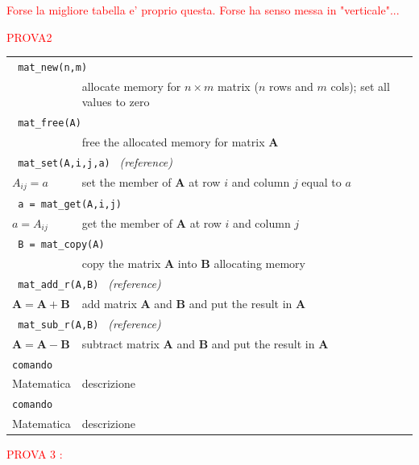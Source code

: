 \documentclass[10pt]{article}
\begin{document}
\textcolor{red}{Forse la migliore tabella e' proprio questa. Forse ha senso messa in "verticale"...}


\newpage

\textcolor{red}{PROVA2}

\begin{longtable}{@{} p{4cm} p{7cm} @{}}
\toprule
\multicolumn{2}{l}{\texttt{ mat\_new(n,m) }} \\
 &
allocate memory for $n\times m$ matrix ($n$ rows and $m$ cols); set all values to zero \\
\hline
\multicolumn{2}{l}{\texttt{ mat\_free(A)} } \\
 &
free the allocated memory for matrix $\mathbf{A}$ \\
\hline
\multicolumn{2}{l}{\texttt{ mat\_set(A,i,j,a) } \hfill \textit{(reference)}} \\
$A_{ij}=a$ &
set the member of $\mathbf{A}$ at row $i$ and column $j$ equal to $a$ \\
\hline
\multicolumn{2}{l}{\texttt{ a = mat\_get(A,i,j) }} \\
$a=A_{ij}$ &
get the member of $\mathbf{A}$ at row $i$ and column $j$ \\
\hline
\multicolumn{2}{l}{\texttt{ B = mat\_copy(A) }} \\
 &
copy the matrix $\mathbf{A}$ into $\mathbf{B}$ allocating memory \\
\hline
\multicolumn{2}{l}{\texttt{ mat\_add\_r(A,B) } \hfill \textit{(reference)}} \\
$\mathbf{A}=\mathbf{A}+\mathbf{B}$ &
add matrix $\mathbf{A}$ and $\mathbf{B}$ and put the result in $\mathbf{A}$ \\
\hline
\multicolumn{2}{l}{\texttt{ mat\_sub\_r(A,B) } \hfill \textit{(reference)}} \\
$\mathbf{A}=\mathbf{A}-\mathbf{B}$ &
subtract matrix $\mathbf{A}$ and $\mathbf{B}$ and put the result in $\mathbf{A}$ \\
\hline
\multicolumn{2}{l}{\texttt{comando}} \\
Matematica &
descrizione \\
\hline
\multicolumn{2}{l}{\texttt{comando}} \\
Matematica &
descrizione \\

\bottomrule

\end{longtable}

\newpage

\textcolor{red}{PROVA 3 :}
\end{document}
